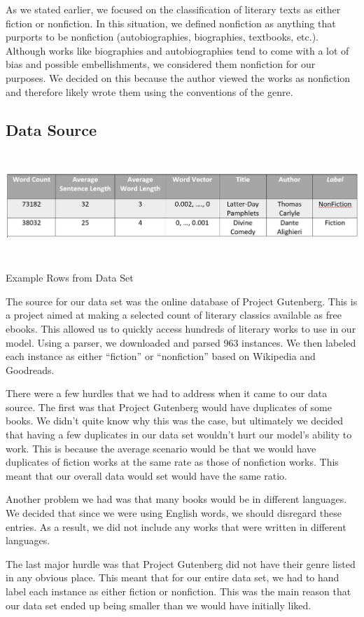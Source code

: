 \documentclass{article}
\begin{document}
As we stated earlier, we focused on the classification of literary texts as either fiction or nonfiction. In this situation, we defined nonfiction as anything that purports to be nonfiction (autobiographies, biographies, textbooks, etc.). Although works like biographies and autobiographies tend to come with a lot of bias and possible embellishments, we considered them nonfiction for our purposes. We decided on this because the author viewed the works as nonfiction and therefore likely wrote them using the conventions of the genre.

\subsection{Data Source}
\begin{table}
  \includegraphics[width=\textwidth,height=4cm]{Table1.JPG}
  \caption{Example Rows from Data Set}
\end{table}

The source for our data set was the online database of Project Gutenberg. This is a project aimed at making a selected count of literary classics available as free ebooks. This allowed us to quickly access hundreds of literary works to use in our model. Using a parser, we downloaded and parsed 963 instances. We then labeled each instance as either “fiction” or “nonfiction” based on Wikipedia and Goodreads. \par
There were a few hurdles that we had to address when it came to our data source. The first was that Project Gutenberg would have duplicates of some books. We didn’t quite know why this was the case, but ultimately we decided that having a few duplicates in our data set wouldn’t hurt our model’s ability to work. This is because the average scenario would be that we would have duplicates of fiction works at the same rate as those of nonfiction works. This meant that our overall data would set would have the same ratio. \par
Another problem we had was that many books would be in different languages. We decided that since we were using English words, we should disregard these entries. As a result, we did not include any works that were written in different languages. \par
The last major hurdle was that Project Gutenberg did not have their genre listed in any obvious place. This meant that for our entire data set, we had to hand label each instance as either fiction or nonfiction. This was the main reason that our data set ended up being smaller than we would have initially liked.
\end{document}
